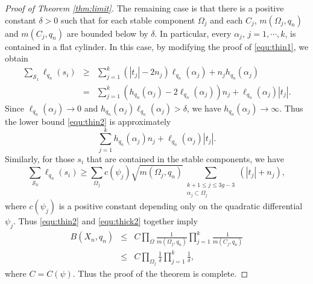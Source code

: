 \documentclass{amsart}
\theoremstyle{plain}
\theoremstyle{definition}
\numberwithin{equation}{section}
\begin{document}
\begin{proof}[Proof of Theorem \ref{thm:limit}]
The remaining case is that there is a positive constant $\delta>0$ such that for each stable component $\Omega_j$
and each $C_j$,  $m(\Omega_j, q_n)$ and $m(C_j, q_n)$ are bounded below by $\delta$. 
In particular, every $\alpha_j$, $j=1, \cdots, k$, is contained in a flat cylinder. 
In this case, by modifying the proof of \eqref{equ:thin1}, we obtain
\begin{eqnarray}\label{equ:thin2}
 \sum_{\mathcal{S}_1} \ell_{q_n}(s_i) & \geq &  \sum_{j=1}^k  \left(|t_j|-2n_j \right) \ell_{q_n}(\alpha_j)
  + n_j h_{q_n}(\alpha_j) \nonumber \\
  &=&  \sum_{j=1}^k  \left(h_{q_n}(\alpha_j) -2 \ell_{q_n}(\alpha_j) \right) n_j + \ell_{q_n}(\alpha_j) |t_j|.
\end{eqnarray} 
Since $\ell_{q_n}(\alpha_j) \to 0$ and $h_{q_n}(\alpha_j) \ell_{q_n}(\alpha_j) >\delta$, we have 
$h_{q_n}(\alpha_j) \to \infty$. 
Thus the lower bound \eqref{equ:thin2} is approximately 
$$\sum_{j=1}^k  h_{q_n}(\alpha_j)  n_j + \ell_{q_n}(\alpha_j) |t_j|.$$
Similarly, for those $s_i$ that are contained in the stable components,
we have 
\begin{equation}\label{equ:thick2}
  \sum_{\mathcal{S}_0} \ell_{q_n}(s_i) \geq   \sum_{\Omega_j} c(\psi_j) \sqrt{m(\Omega_j,q_n)}   \sum_{\substack{k+1\leq j \leq 3g-3 \\ \alpha_j \subset \Omega_j}}   (|t_j| + n_j),
\end{equation}
where $c(\psi_j)$ is a positive constant depending only on the quadratic differential $\psi_j$.
Thus \eqref{equ:thin2} and \eqref{equ:thick2} together imply
\begin{eqnarray*}
B(X_n,q_n) &\leq& C \prod_{\Omega} \frac{1 }{m(\Omega_j, q_n)} \prod_{j=1}^k \frac{1}{m(C_j, q_n)}  \\
&\leq& C \prod_{\Omega_j} \frac{1 }{\delta} \prod_{j=1}^k \frac{1}{\delta},
\end{eqnarray*} 
where $C=C(\psi)$.
Thus the proof of the theorem is complete.


\end{proof}
\end{document}
